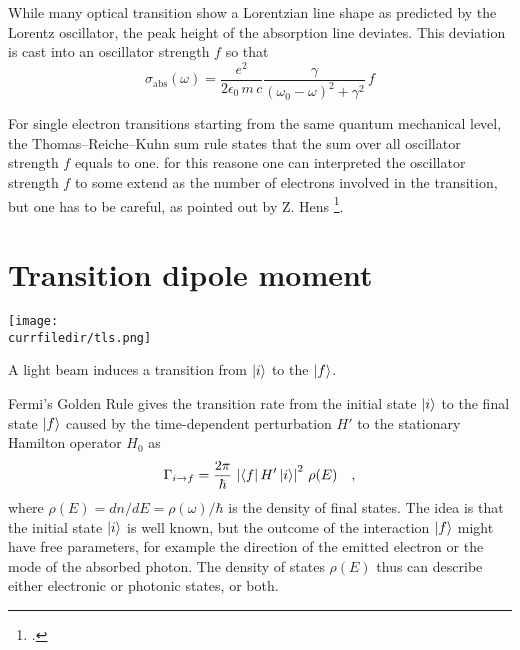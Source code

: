 While many optical transition show a Lorentzian line shape as predicted by the Lorentz oscillator, the peak height of the absorption line deviates. This deviation is cast into an oscillator strength $f$ so that 
\[
 \sigma_{\text{abs}}(\omega) =   \frac{e^2  }{2 \epsilon_0 \,  m \, c}  \frac{\gamma  }{(\omega_0 - \omega)^2 +  \gamma ^2}  \, f
\]

For single electron transitions starting from the same quantum mechanical level, the Thomas–Reiche–Kuhn sum rule states that the sum over all oscillator strength $f$ equals to one. for this reasone one can interpreted the oscillator strength  $f$  to some extend  as the number of electrons involved in  the transition, but one has to be careful, as pointed out by Z. Hens \footcite{Hens:2008kr}.




\section{Transition dipole moment}

\begin{marginfigure}
\texttt{[image: \\currfiledir/tls.png]}
\caption{A light beam induces a transition from $\ket{i}$ to the  $\ket{f}$.}
\end{marginfigure}

Fermi's Golden Rule gives the transition rate from the initial state $\ket{i}$ to the final state $\ket{f}$ caused by the time-dependent perturbation $H'$ to the stationary Hamilton operator $H_0$ as
\[
 \Gamma_{i \rightarrow f} = \frac{2 \pi}{\hbar} \, \left| \bra{f} H' \ket{i} \right|^2 \, \rho(E) \quad ,
\]
where  $\rho(E) = d n / d E = \rho(\omega) / \hbar$ is the density of final states. The idea is that the initial state  $\ket{i}$ is well known, but the outcome of the interaction $\ket{f}$ might have free parameters, for example the direction of the emitted electron or the mode of the absorbed photon. The density of states   $\rho(E)$ thus can describe either electronic or photonic states, or both.




